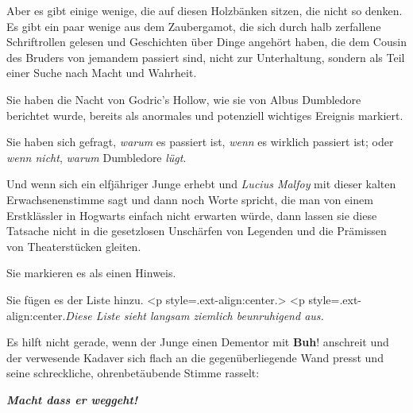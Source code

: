 Aber es gibt einige wenige, die auf diesen Holzbänken sitzen, die nicht so
denken. Es gibt ein paar wenige aus dem Zaubergamot, die sich durch halb
zerfallene Schriftrollen gelesen und Geschichten über Dinge angehört haben, die
dem Cousin des Bruders von jemandem passiert sind, nicht zur Unterhaltung,
sondern als Teil einer Suche nach Macht und Wahrheit.

Sie haben die Nacht von Godric's Hollow, wie sie von Albus Dumbledore berichtet
wurde, bereits als anormales und potenziell wichtiges Ereignis markiert.

Sie haben sich gefragt, \emph{warum} es passiert ist, \emph{wenn} es wirklich
passiert ist; oder \emph{wenn nicht}, \emph{warum} Dumbledore \emph{lügt}.

Und wenn sich ein elfjähriger Junge erhebt und \emph{\glqq{}Lucius Malfoy\grqq{}
} mit dieser kalten Erwachsenenstimme sagt und dann noch Worte spricht, die man
von einem Erstklässler in Hogwarts einfach nicht erwarten würde, dann lassen sie
diese Tatsache nicht in die gesetzlosen Unschärfen von Legenden und die
Prämissen von Theaterstücken gleiten.

Sie markieren es als einen Hinweis.


Sie fügen es der Liste hinzu.   <p
style=\grqq{}.ext-align:center\grqq{}.> <p
style=\grqq{}.ext-align:center\grqq{}.\emph{Diese Liste sieht langsam ziemlich
beunruhigend aus.}


Es hilft nicht gerade, wenn der Junge einen Dementor mit \glqq
\textbf{Buh}!\grqq{} anschreit und der verwesende Kadaver sich flach an die
gegenüberliegende Wand presst und seine schreckliche, ohrenbetäubende Stimme
rasselt:

\textbf{\emph{\glqq{}Macht dass er
weggeht!\grqq{}} }

